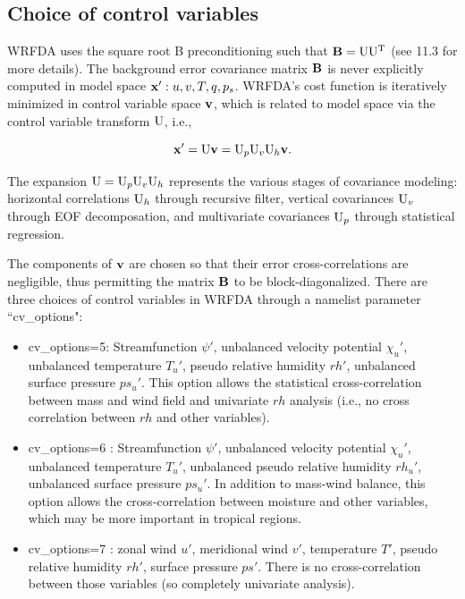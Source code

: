 \subsection{Choice of control variables}
\label{var-cvs}

WRFDA uses the square root B preconditioning such that ${\bf B} = {\rm U} {\rm U^T} $ (see 11.3 for more details). 
The background error covariance matrix ${\bf B}$ is never explicitly computed in model space ${\bf x}': u, v, T, q, p_{s}$.  WRFDA's cost function is iteratively minimized in 
control variable space ${\bf v}$, which is related to model space via the control variable transform ${\rm U}$, 
i.e.,

\begin{equation}
{\bf x}' = {\rm U}{\bf v}= {\rm U}_{p} {\rm U}_{v} {\rm U}_{h}{\bf v}.
\label{var-cv}
\end{equation}

The expansion ${\rm U}={\rm U}_{p} 
{\rm U}_{v} {\rm U}_{h}$ represents the various stages of covariance modeling: horizontal correlations ${\rm U}_{h}$ through 
recursive filter, vertical covariances ${\rm U}_{v}$ through EOF decomposation, and multivariate covariances
${\rm U}_{p}$ through statistical regression.

The components of ${\bf v}$ are chosen so that their error cross-correlations are negligible, 
thus permitting the matrix ${\bf B}$ to be block-diagonalized. There are three choices of control variables in WRFDA
through a namelist parameter ``cv\_options":
\begin{itemize}\setlength{\parskip}{-4pt}
\item
 cv\_options=5: Streamfunction $\psi'$, unbalanced velocity potential $\chi_u'$, 
unbalanced temperature $T_u'$, pseudo relative humidity $rh'$, unbalanced surface pressure $ps_u'$. 
This option allows the statistical cross-correlation between mass and wind field and univariate $rh$ analysis 
(i.e., no cross correlation between $rh$ and other variables).

\item
 cv\_options=6 \citep{chen13}: Streamfunction $\psi'$, unbalanced velocity potential $\chi_u'$, 
unbalanced temperature $T_u'$, unbalanced pseudo relative humidity $rh_u'$, unbalanced surface pressure $ps_u'$.
In addition to mass-wind balance, this option allows the cross-correlation between moisture and other variables, which
may be more important in tropical regions.

\item
 cv\_options=7 \citep{sun15}: zonal wind $u'$, meridional wind $v'$, temperature $T'$, pseudo relative humidity $rh'$, 
 surface pressure $ps'$. There is no cross-correlation between those variables (so completely univariate analysis).
\end{itemize}

